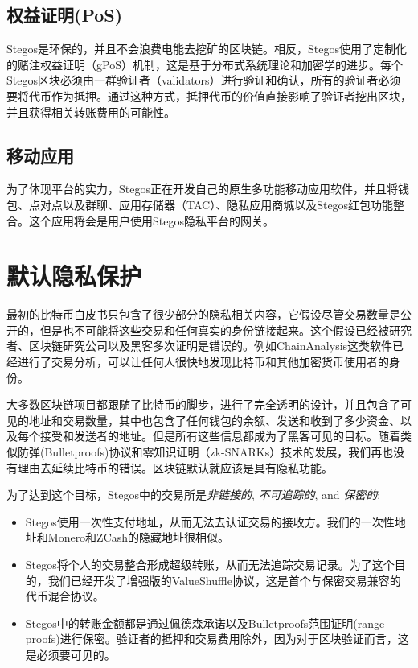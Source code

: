 \documentclass[8pt,fleqn,openany]{book}
\begin{document}
\begin{CJK*}{UTF8}{gbsn}
\subsection{权益证明(PoS)}
Stegos是环保的，并且不会浪费电能去挖矿的区块链。相反，Stegos使用了定制化的赌注权益证明（gPoS）机制，这是基于分布式系统理论和加密学的进步。每个Stegos区块必须由一群验证者（validators）进行验证和确认，所有的验证者必须要将代币作为抵押。通过这种方式，抵押代币的价值直接影响了验证者挖出区块，并且获得相关转账费用的可能性。

\subsection{移动应用}
为了体现平台的实力，Stegos正在开发自己的原生多功能移动应用软件，并且将钱包、点对点以及群聊、应用存储器（TAC）、隐私应用商城以及Stegos红包功能整合。这个应用将会是用户使用Stegos隐私平台的网关。
	

\section{默认隐私保护}
最初的比特币白皮书只包含了很少部分的隐私相关内容，它假设尽管交易数量是公开的，但是也不可能将这些交易和任何真实的身份链接起来。这个假设已经被研究者、区块链研究公司以及黑客多次证明是错误的。例如ChainAnalysis这类软件已经进行了交易分析，可以让任何人很快地发现比特币和其他加密货币使用者的身份。

大多数区块链项目都跟随了比特币的脚步，进行了完全透明的设计，并且包含了可见的地址和交易数量，其中也包含了任何钱包的余额、发送和收到了多少资金、以及每个接受和发送者的地址。但是所有这些信息都成为了黑客可见的目标。随着类似防弹(Bulletproofs)协议和零知识证明（zk-SNARKs）技术的发展，我们再也没有理由去延续比特币的错误。区块链默认就应该是具有隐私功能。
	
为了达到这个目标，Stegos中的交易所是\textit{非链接的}, \textit{不可追踪的}, and \textit{保密的}:

\begin{itemize}
	\item Stegos使用一次性支付地址，从而无法去认证交易的接收方。我们的一次性地址和Monero和ZCash的隐藏地址很相似。
	\item Stegos将个人的交易整合形成超级转账，从而无法追踪交易记录。为了这个目的，我们已经开发了增强版的ValueShuffle协议\cite{c7}，这是首个与保密交易兼容的代币混合协议。
	\item Stegos中的转账金额都是通过佩德森承诺\cite{c8}以及Bulletproofs范围证明(range proofs)\cite{c4}进行保密。验证者的抵押和交易费用除外，因为对于区块验证而言，这是必须要可见的。\end{itemize}


\end{CJK*}
\end{document}
